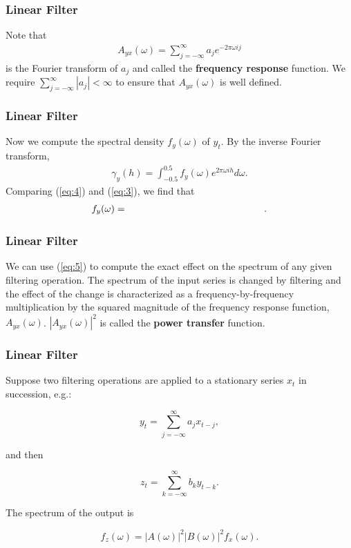 \documentclass[%
xcolor=pdftex]{beamer}
\begin{document}
\begin{frame}
\frametitle{Linear Filter}

Note that
\begin{eqnarray} \label{eq:res}
A_{yx}(\omega) = \sum^\infty_{j=-\infty} a_j e^{-2\pi \omega i j}
\end{eqnarray}
is the Fourier transform of $a_j$ and called the {\bf frequency
response} function. We require $\sum^\infty_{j=-\infty}|a_j|<\infty$ to ensure that
$A_{yx}(\omega)$ is well defined.

\end{frame}

\begin{frame}
\frametitle{Linear Filter}

Now we compute the spectral density $f_y(\omega)$ of $y_t$. By
the inverse Fourier transform,
\begin{eqnarray}\label{eq:4}
\gamma_y(h)  = \int^{0.5}_{-0.5} f_y(\omega) e^{2\pi \omega i h}d\omega.
\end{eqnarray}
Comparing (\ref{eq:4}) and (\ref{eq:3}), we find that
\begin{eqnarray}\label{eq:5}
f_y(\omega)  =  \hspace{50mm}.
\end{eqnarray}


\end{frame}

\begin{frame}
\frametitle{Linear Filter}

We can use (\ref{eq:5}) to compute the exact effect on the spectrum of any given filtering operation. The spectrum of the input series is changed by filtering and the effect of the change is characterized as a frequency-by-frequency multiplication by the squared magnitude of the frequency response function, $A_{yx}(\omega)$. $|A_{yx}(\omega)|^2$ is called the \textbf{power transfer} function.

\end{frame}

\begin{frame}
\frametitle{Linear Filter}

Suppose two filtering operations are applied to a stationary series $x_t$ in succession, e.g.:

$$
y_t = \sum_{j=-\infty}^{\infty} a_j x_{t-j},
$$

and then

$$
z_t = \sum_{k=-\infty}^{\infty} b_k y_{t-k}.
$$

The spectrum of the output is

$$
f_z(\omega) = |A(\omega)|^2 |B(\omega)|^2 f_x(\omega).
$$

\end{frame}
\end{document}
